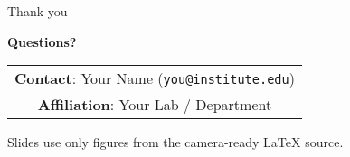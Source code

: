 \begin{frame}{Thank you}
\Large
\begin{center}
  \vspace{6mm}
  \textbf{Questions?}
  
  \vspace{8mm}
  \normalsize
  \begin{tabular}{c}
    \textbf{Contact}: Your Name (\texttt{you@institute.edu}) \\
    \textbf{Affiliation}: Your Lab / Department \\
  \end{tabular}

  \vspace{8mm}
  \small
  Slides use only figures from the camera-ready LaTeX source.
\end{center}
\end{frame}
